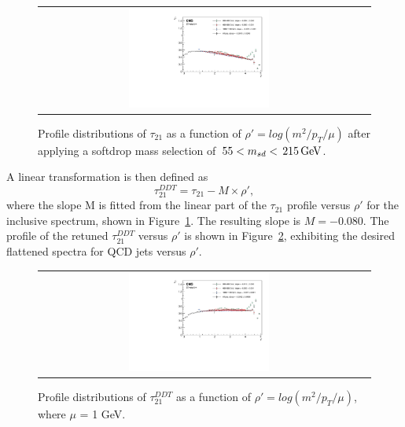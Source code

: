 \begin{figure}[h!]
\centering
\begin{tabular}{cc}
\includegraphics[width=0.45\textwidth]{figures/analysis/search3/AN-17-303/vtag/rho_pythia_FullSel_rhoPrime.pdf}\\
\end{tabular}
\caption{Profile distributions of $\tau_{21}$ as a function of $\rho' = log(m^2/p_T/\mu)$ after applying a softdrop mass selection of $\text{\,55} < m_{sd} < \text{\,215}{\ensuremath{\,\text{Ge\hspace{-.08em}V}}}$.}
\label{fig:rho}
\end{figure}
A linear transformation is then defined as
\begin{equation}
\label{eq:ddt}
\tau_{21}^{DDT}=\tau_{21}-M\times\rho',
\end{equation}
where the slope M is fitted from the linear part of the $\tau_{21}$ profile versus $\rho'$ for the inclusive \PT spectrum, shown in Figure~\ref{fig:rho}. The resulting slope is $\ensuremath{M} = -0.080$.
The profile of the retuned $\tau_{21}^{DDT}$ versus $\rho'$ is shown in Figure~\ref{fig:rhoClosure}, exhibiting the desired flattened spectra for QCD jets versus $\rho'$.
\begin{figure}[h!]
\centering
\begin{tabular}{cc}
\includegraphics[width=0.45\textwidth]{figures/analysis/search3/AN-17-303/vtag/rho_pythia_FullSel_rhoPrimeClosure.pdf}
\end{tabular}
\caption{Profile distributions of $\tau_{21}^{DDT}$ as a function of $\rho' = log(m^2/p_T/\mu)$, where $\mu$ = 1 GeV.}
\label{fig:rhoClosure}
\end{figure}
